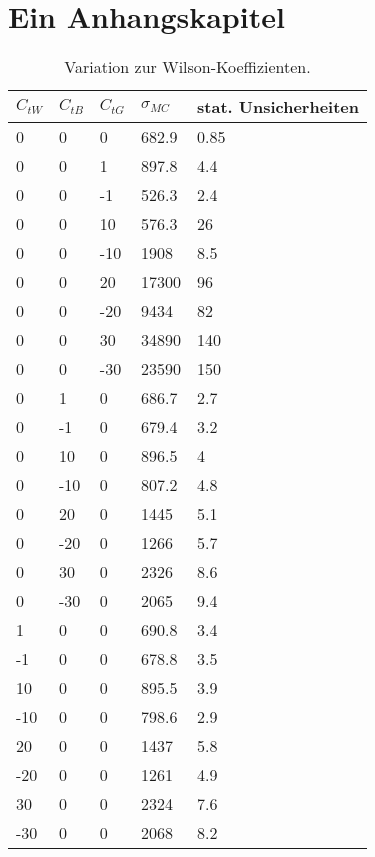 \chapter{Ein Anhangskapitel}
\begin{table}
  \centering
  \caption{Variation zur Wilson-Koeffizienten.}
  \begin{tabular}{lllll}
    \toprule
    $C_{tW}$ & $C_{tB}$ & $C_{tG}$ & $\sigma_{MC}$ & stat. Unsicherheiten\\
		\midrule
  0    &     0      &     0      &      682.9   &    0.85\\
  0    &     0      &     1      &      897.8   &    4.4\\
  0    &     0      &     -1     &      526.3   &    2.4\\
  0    &     0      &     10     &      576.3   &    26\\
  0    &     0      &     -10    &      1908    &    8.5\\
  0    &     0      &     20     &      17300   &    96\\
  0    &     0      &     -20    &      9434    &    82\\
  0    &     0      &     30     &      34890   &    140\\
  0    &     0      &     -30    &      23590   &    150\\
  0    &     1      &     0      &      686.7   &    2.7\\
  0    &     -1     &     0      &      679.4   &    3.2\\
  0    &     10     &     0      &      896.5   &    4\\
  0    &     -10    &     0      &      807.2   &    4.8\\
  0    &     20     &     0      &      1445    &    5.1\\
  0    &     -20    &     0      &      1266    &    5.7\\
  0    &     30     &     0      &      2326    &    8.6\\
  0    &     -30    &     0      &      2065    &    9.4\\
  1    &     0      &     0      &      690.8   &    3.4\\
  -1   &     0      &     0      &      678.8   &    3.5\\
  10   &     0      &     0      &      895.5   &    3.9\\
  -10  &     0      &     0      &      798.6   &    2.9\\
  20   &     0      &     0      &      1437    &    5.8\\
  -20  &     0      &     0      &      1261    &    4.9\\
  30   &     0      &     0      &      2324    &    7.6\\
  -30   &    0      &     0      &      2068   &     8.2\\
  \bottomrule
\end{tabular}
\label{tab:lit}
\end{table}
